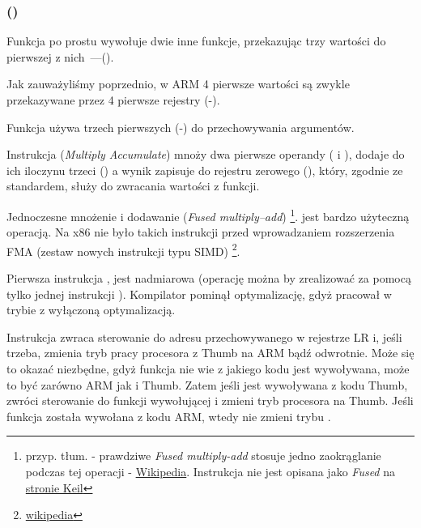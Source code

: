 \subsubsection{\NonOptimizingKeilVI (\ARMMode)}



Funkcja \main po prostu wywołuje dwie inne funkcje, przekazując trzy wartości do pierwszej z nich~---(\ttf).

Jak zauważyliśmy poprzednio, w ARM 4 pierwsze wartości są zwykle przekazywane przez 4 pierwsze rejestry (-).

Funkcja \ttf używa trzech pierwszych (-) do przechowywania argumentów.

Instrukcja  (\emph{Multiply Accumulate})
mnoży dwa pierwsze operandy ( i ), dodaje do ich iloczynu trzeci () a wynik zapisuje
do rejestru zerowego (), który, zgodnie ze standardem, służy do zwracania wartości z funkcji.

Jednoczesne mnożenie i dodawanie (\emph{Fused multiply–add}) \footnote{przyp. tłum. - prawdziwe \emph{Fused multiply-add} stosuje jedno zaokrąglanie podczas tej operacji - \href{https://en.wikipedia.org/wiki/Multiply%E2%80%93accumulate_operation#Fused_multiply%E2%80%93add}{Wikipedia}. Instrukcja \TT{MLA} nie jest opisana jako \emph{Fused} na \href{https://www.keil.com/support/man/docs/armasm/armasm_dom1361289878324.htm}{stronie Keil}}.
jest bardzo użyteczną operacją. Na x86 nie było takich instrukcji przed wprowadzaniem rozszerzenia FMA (zestaw nowych instrukcji typu SIMD)
\footnote{\href{https://en.wikipedia.org/wiki/FMA_instruction_set}{wikipedia}}.

Pierwsza instrukcja ,
jest nadmiarowa (operację można by zrealizować za pomocą tylko jednej instrukcji ).
Kompilator pominął optymalizację, gdyż pracował w trybie z wyłączoną optymalizacją.


Instrukcja  zwraca sterowanie do adresu przechowywanego w rejestrze \ac{LR} i, jeśli trzeba,
zmienia tryb pracy procesora z Thumb na ARM bądź odwrotnie.
Może się to okazać niezbędne, gdyż funkcja \ttf nie wie z jakiego kodu jest wywoływana, może to być zarówno ARM jak i Thumb.
Zatem jeśli jest wywoływana z kodu Thumb,
 zwróci sterowanie do funkcji wywołującej i zmieni tryb procesora na Thumb.
Jeśli funkcja została wywołana z kodu ARM, wtedy nie zmieni trybu .
